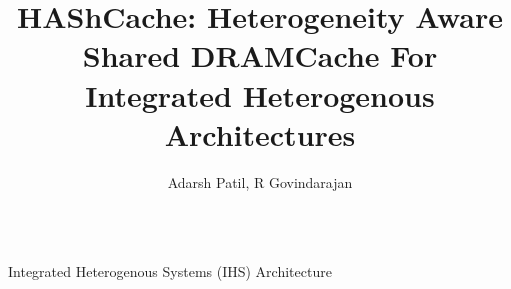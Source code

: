 \documentclass[final,t]{beamer}
\title{\LARGE HAShCache: Heterogeneity Aware Shared DRAMCache For Integrated Heterogenous Architectures}
\author{Adarsh Patil, R Govindarajan}
\institute{Department of CSA, Indian Institute of Science, Bangalore }
\begin{document}


\begin{frame}[t,fragile]{}

\small



    \vspace{1.5em}
    \begin{tcolorbox}[colback=red!5!white,
                      colframe=red!75!black,
                     ]
        \begin{columns}[t]
        \begin{column}{.48\linewidth}
       
            \begin{exampleblock}{Integrated Heterogenous Systems (IHS) Architecture}


\end{exampleblock}
\end{column}
\end{columns}
\end{tcolorbox}
\end{frame}
\end{document}
